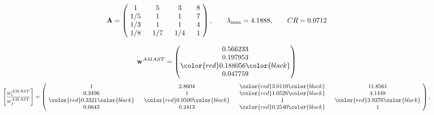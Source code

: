 \begin{example}
\begin{equation*}
\mathbf{A} =
\begin{pmatrix}
$\,\,$ 1 $\,\,$ & $\,\,$5$\,\,$ & $\,\,$3$\,\,$ & $\,\,$8 $\,\,$ \\
$\,\,$ 1/5$\,\,$ & $\,\,$ 1 $\,\,$ & $\,\,$1$\,\,$ & $\,\,$7 $\,\,$ \\
$\,\,$ 1/3$\,\,$ & $\,\,$ 1 $\,\,$ & $\,\,$ 1 $\,\,$ & $\,\,$4 $\,\,$ \\
$\,\,$ 1/8$\,\,$ & $\,\,$ 1/7$\,\,$ & $\,\,$ 1/4$\,\,$ & $\,\,$ 1  $\,\,$ \\
\end{pmatrix},
\qquad
\lambda_{\max} =
4.1888,
\qquad
CR = 0.0712
\end{equation*}

\begin{equation*}
\mathbf{w}^{AMAST} =
\begin{pmatrix}
0.566233\\
0.197953\\
\color{red} 0.188056\color{black} \\
0.047759
\end{pmatrix}\end{equation*}
\begin{equation*}
\left[ \frac{{w}^{AMAST}_i}{{w}^{AMAST}_j} \right] =
\begin{pmatrix}
$\,\,$ 1 $\,\,$ & $\,\,$2.8604$\,\,$ & $\,\,$\color{red} 3.0110\color{black} $\,\,$ & $\,\,$11.8561$\,\,$ \\
$\,\,$0.3496$\,\,$ & $\,\,$ 1 $\,\,$ & $\,\,$\color{red} 1.0526\color{black} $\,\,$ & $\,\,$4.1448  $\,\,$ \\
$\,\,$\color{red} 0.3321\color{black} $\,\,$ & $\,\,$\color{red} 0.9500\color{black} $\,\,$ & $\,\,$ 1 $\,\,$ & $\,\,$\color{red} 3.9376\color{black}  $\,\,$ \\
$\,\,$0.0843$\,\,$ & $\,\,$0.2413$\,\,$ & $\,\,$\color{red} 0.2540\color{black} $\,\,$ & $\,\,$ 1  $\,\,$ \\
\end{pmatrix},
\end{equation*}


\end{example}
